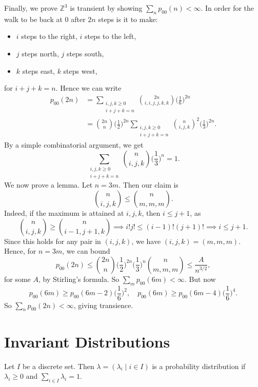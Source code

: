 \documentclass[12pt]{article}
\begin{document}
\begin{proofbox}
Finally, we prove $\mathbb{Z}^3$ is transient by showing $\sum_n p_{00}(n) < \infty$. In order for the walk to be back at $0$ after $2n$ steps is it to make:
\begin{itemize}
	\item $i$ steps to the right, $i$ steps to the left,
	\item $j$ steps north, $j$ steps south,
	\item $k$ steps east, $k$ steps west,
\end{itemize}
for $i+j+k = n$. Hence we can write
\begin{align*}
	p_{00}(2n) &= \sum_{\substack{i, j, k \geq 0 \\ i + j + k = n}} \binom{2n}{i,i,j,j,k,k} \biggl(\frac{1}{6}\biggr)^{2n} \\
		   &= \binom{2n}{n} \biggl( \frac{1}{2} \biggr)^{2n} \sum_{\substack{i, j, k \geq 0 \\i + j + k = n}} \binom{n}{i,j,k}^2 \biggl(\frac{1}{3}\biggr)^{2n}.
\end{align*}
By a simple combinatorial argument, we get
\[
	\sum_{\substack{i, j, k \geq 0 \\i + j + k = n}}\binom{n}{i,j,k} \biggl(\frac{1}{3}\biggr)^{n} = 1
.\]
We now prove a lemma. Let $n = 3m$. Then our claim is
\[
	\binom{n}{i,j,k} \leq \binom{n}{m,m,m}
.\]
Indeed, if the maximum is attained at $i, j, k$, then $i \leq j + 1$, as
\[
	\binom{n}{i,j,k} \geq \binom{n}{i-1,j+1,k} \implies i!j! \leq (i-1)!(j+1)! \implies i \leq j + 1
.\]
Since this holds for any pair in $(i,j,k)$, we have $(i,j,k) = (m,m,m)$. Hence, for $n = 3m$, we can bound
\[
	p_{00}(2n) \leq \binom{2n}{n} \biggl(\frac{1}{2}\biggr)^{2n} \biggl(\frac{1}{3}\biggr)^{n} \binom{n}{m,m,m} \leq \frac{A}{n^{3/2}}
,\]
for some $A$, by Stirling's formula. So $\sum_{m} p_{00}(6m) < \infty$. But now
\[
	p_{00}(6m) \geq p_{00}(6m - 2) \biggl(\frac{1}{6}\biggr)^2, \quad p_{00}(6m) \geq p_{00}(6m - 4) \biggl(\frac{1}{6}\biggr)^{4}
.\]
So $\sum_{n} p_{00}(2n) < \infty$, giving transience.
\end{proofbox}

\section{Invariant Distributions}%
\label{sec:invariant_distributions}

\begin{definition}
	Let $I$ be a discrete set. Then $\lambda = (\lambda_i \mid i \in I)$ is a probability distribution if $\lambda_i \geq 0$ and $\sum_{i \in I}\lambda_i = 1$.
\end{definition}
\end{document}
